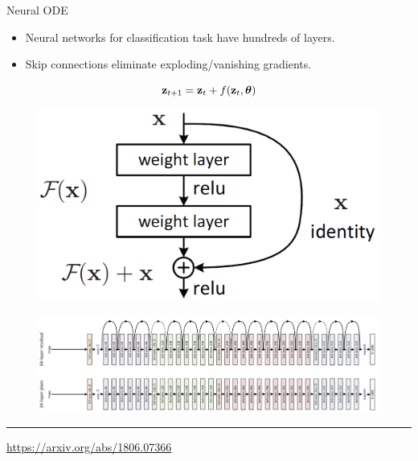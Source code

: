 

\begin{frame}
\titlepage
\end{frame}
\begin{frame}{Neural ODE}
\begin{minipage}[t]{0.6\columnwidth}
\vspace{0.2cm}
\begin{itemize}
	\item Neural networks for classification task have hundreds of layers.
	\item Skip connections eliminate exploding/vanishing gradients.
\end{itemize}
\[
	\mathbf{z}_{t + 1} = \mathbf{z}_t + f(\mathbf{z}_t, \boldsymbol{\theta})
\]
\end{minipage}%
\begin{minipage}[t]{0.4\columnwidth}
\begin{figure}
    \centering
    \includegraphics[width=0.95\linewidth]{figs/resnet_1.png}
\end{figure}
\end{minipage}
\begin{figure}
    \centering
    \includegraphics[width=\linewidth]{figs/resnet_2.png}
\end{figure}
\vfill
\hrule\medskip
{\scriptsize \href{https://arxiv.org/abs/1806.07366}{https://arxiv.org/abs/1806.07366}}   
\end{frame}
